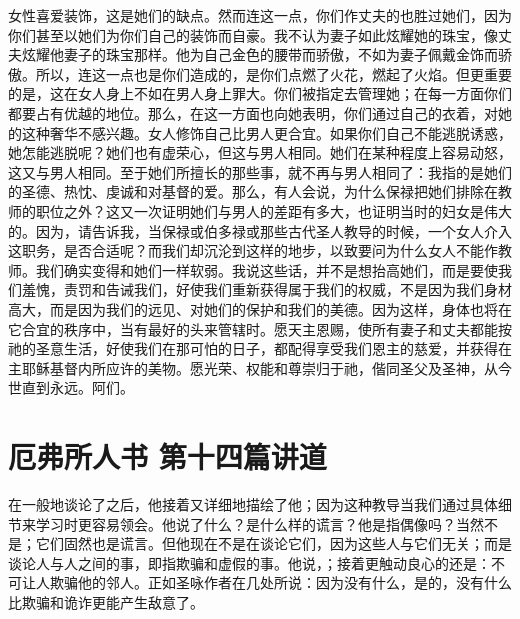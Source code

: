 女性喜爱装饰，这是她们的缺点。然而连这一点，你们作丈夫的也胜过她们，因为你们甚至以她们为你们自己的装饰而自豪。我不认为妻子如此炫耀她的珠宝，像丈夫炫耀他妻子的珠宝那样。他为自己金色的腰带而骄傲，不如为妻子佩戴金饰而骄傲。所以，连这一点也是你们造成的，是你们点燃了火花，燃起了火焰。但更重要的是，这在女人身上不如在男人身上罪大。你们被指定去管理她；在每一方面你们都要占有优越的地位。那么，在这一方面也向她表明，你们通过自己的衣着，对她的这种奢华不感兴趣。女人修饰自己比男人更合宜。如果你们自己不能逃脱诱惑，她怎能逃脱呢？她们也有虚荣心，但这与男人相同。她们在某种程度上容易动怒，这又与男人相同。至于她们所擅长的那些事，就不再与男人相同了：我指的是她们的圣德、热忱、虔诚和对基督的爱。那么，有人会说，为什么保禄把她们排除在教师的职位之外？这又一次证明她们与男人的差距有多大，也证明当时的妇女是伟大的。因为，请告诉我，当保禄或伯多禄或那些古代圣人教导的时候，一个女人介入这职务，是否合适呢？而我们却沉沦到这样的地步，以致要问为什么女人不能作教师。我们确实变得和她们一样软弱。我说这些话，并不是想抬高她们，而是要使我们羞愧，责罚和告诫我们，好使我们重新获得属于我们的权威，不是因为我们身材高大，而是因为我们的远见、对她们的保护和我们的美德。因为这样，身体也将在它合宜的秩序中，当有最好的头来管辖时。愿天主恩赐，使所有妻子和丈夫都能按祂的圣意生活，好使我们在那可怕的日子，都配得享受我们恩主的慈爱，并获得在主耶稣基督内所应许的美物。愿光荣、权能和尊崇归于祂，偕同圣父及圣神，从今世直到永远。阿们。\par



\section{厄弗所人书 第十四篇讲道}

\par

\par

在一般地谈论了之后，他接着又详细地描绘了他；因为这种教导当我们通过具体细节来学习时更容易领会。他说了什么？是什么样的谎言？他是指偶像吗？当然不是；它们固然也是谎言。但他现在不是在谈论它们，因为这些人与它们无关；而是谈论人与人之间的事，即指欺骗和虚假的事。他说，；接着更触动良心的还是：不可让人欺骗他的邻人。正如圣咏作者在几处所说：因为没有什么，是的，没有什么比欺骗和诡诈更能产生敌意了。\par

